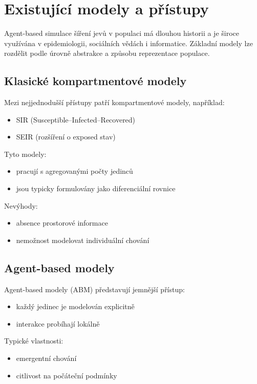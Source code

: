 \section{Existující modely a přístupy}

Agent-based simulace šíření jevů v populaci má dlouhou historii a je široce využívána v epidemiologii, sociálních vědách i informatice. Základní modely lze rozdělit podle úrovně abstrakce a způsobu reprezentace populace.

\subsection{Klasické kompartmentové modely}

Mezi nejjednodušší přístupy patří kompartmentové modely, například:

\begin{itemize}
\item SIR (Susceptible--Infected--Recovered)
\item SEIR (rozšíření o exposed stav)
\end{itemize}

Tyto modely:
\begin{itemize}
\item pracují s agregovanými počty jedinců
\item jsou typicky formulovány jako diferenciální rovnice
\end{itemize}

Nevýhody:
\begin{itemize}
\item absence prostorové informace
\item nemožnost modelovat individuální chování
\end{itemize}

\subsection{Agent-based modely}

Agent-based modely (ABM) představují jemnější přístup:

\begin{itemize}
\item každý jedinec je modelován explicitně
\item interakce probíhají lokálně
\end{itemize}

Typické vlastnosti:
\begin{itemize}
\item emergentní chování
\item citlivost na počáteční podmínky
\end{itemize}

